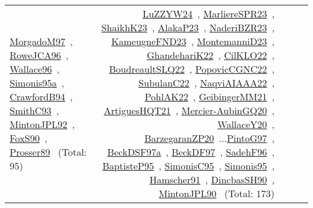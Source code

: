 {\begin{longtable}{p{3cm}r>{\raggedright\arraybackslash}p{6cm}>{\raggedright\arraybackslash}p{6cm}>{\raggedright\arraybackslash}p{8cm}}
\href{../works/MorgadoM97.pdf}{MorgadoM97}~\cite{MorgadoM97}, \href{../works/RoweJCA96.pdf}{RoweJCA96}~\cite{RoweJCA96}, \href{../works/Wallace96.pdf}{Wallace96}~\cite{Wallace96}, \href{../works/Simonis95a.pdf}{Simonis95a}~\cite{Simonis95a}, \href{../works/CrawfordB94.pdf}{CrawfordB94}~\cite{CrawfordB94}, \href{../works/SmithC93.pdf}{SmithC93}~\cite{SmithC93}, \href{../works/MintonJPL92.pdf}{MintonJPL92}~\cite{MintonJPL92}, \href{../works/FoxS90.pdf}{FoxS90}~\cite{FoxS90}, \href{../works/Prosser89.pdf}{Prosser89}~\cite{Prosser89} (Total: 95) & \href{../works/LuZZYW24.pdf}{LuZZYW24}~\cite{LuZZYW24}, \href{../works/MarliereSPR23.pdf}{MarliereSPR23}~\cite{MarliereSPR23}, \href{../works/ShaikhK23.pdf}{ShaikhK23}~\cite{ShaikhK23}, \href{../works/AlakaP23.pdf}{AlakaP23}~\cite{AlakaP23}, \href{../works/NaderiBZR23.pdf}{NaderiBZR23}~\cite{NaderiBZR23}, \href{../works/KameugneFND23.pdf}{KameugneFND23}~\cite{KameugneFND23}, \href{../works/MontemanniD23.pdf}{MontemanniD23}~\cite{MontemanniD23}, \href{../works/GhandehariK22.pdf}{GhandehariK22}~\cite{GhandehariK22}, \href{../works/CilKLO22.pdf}{CilKLO22}~\cite{CilKLO22}, \href{../works/BoudreaultSLQ22.pdf}{BoudreaultSLQ22}~\cite{BoudreaultSLQ22}, \href{../works/PopovicCGNC22.pdf}{PopovicCGNC22}~\cite{PopovicCGNC22}, \href{../works/SubulanC22.pdf}{SubulanC22}~\cite{SubulanC22}, \href{../works/NaqviAIAAA22.pdf}{NaqviAIAAA22}~\cite{NaqviAIAAA22}, \href{../works/PohlAK22.pdf}{PohlAK22}~\cite{PohlAK22}, \href{../works/GeibingerMM21.pdf}{GeibingerMM21}~\cite{GeibingerMM21}, \href{../works/ArtiguesHQT21.pdf}{ArtiguesHQT21}~\cite{ArtiguesHQT21}, \href{../works/Mercier-AubinGQ20.pdf}{Mercier-AubinGQ20}~\cite{Mercier-AubinGQ20}, \href{../works/WallaceY20.pdf}{WallaceY20}~\cite{WallaceY20}, \href{../works/BarzegaranZP20.pdf}{BarzegaranZP20}~\cite{BarzegaranZP20}...\href{../works/PintoG97.pdf}{PintoG97}~\cite{PintoG97}, \href{../works/BeckDSF97a.pdf}{BeckDSF97a}~\cite{BeckDSF97a}, \href{../works/BeckDF97.pdf}{BeckDF97}~\cite{BeckDF97}, \href{../works/SadehF96.pdf}{SadehF96}~\cite{SadehF96}, \href{../works/BaptisteP95.pdf}{BaptisteP95}~\cite{BaptisteP95}, \href{../works/SimonisC95.pdf}{SimonisC95}~\cite{SimonisC95}, \href{../works/Simonis95.pdf}{Simonis95}~\cite{Simonis95}, \href{../works/Hamscher91.pdf}{Hamscher91}~\cite{Hamscher91}, \href{../works/DincbasSH90.pdf}{DincbasSH90}~\cite{DincbasSH90}, \href{../works/MintonJPL90.pdf}{MintonJPL90}~\cite{MintonJPL90} (Total: 173)\\

\end{longtable}}

